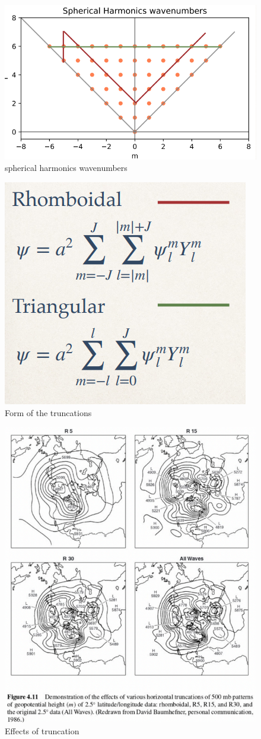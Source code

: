 \begin{figure}[h]
    \centering
    \includegraphics[width=0.5\linewidth]{uploads/Screenshot 2024-11-17 204935.png}
    \caption{spherical harmonics wavenumbers}
    \label{fig:The two most used truncation}
\end{figure}
\begin{figure}[h]
    \centering
    \includegraphics[width=0.35\linewidth]{uploads/Screenshot 2024-11-17 205109.png}
    \caption{Form of the truncations}
    \label{fig:enter-label}
\end{figure}
\begin{figure}[h]
    \centering
    \includegraphics[width=0.5\linewidth]{uploads/Screenshot 2024-11-17 205236.png}
    \caption{Effects of truncation}
    \label{fig:enter-label}
\end{figure}
